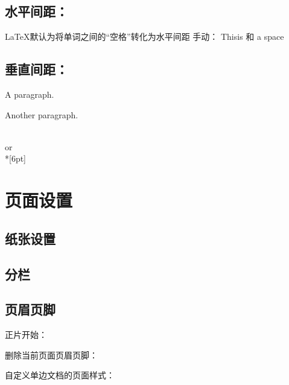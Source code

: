 \documentclass[10pt,a4paper,twocolumn]{book}
\begin{document}
\subsection{水平间距：}
\LaTeX 默认为将单词之间的“空格”转化为水平间距
手动：
This\hspace{1.5cm}is \quad 和 \qquad a space

\subsection{垂直间距：}

{
A paragraph.

\vspace{2ex} 
Another paragraph.
}
\\[6pt] or \\*[6pt]

\section{页面设置}
\subsection{纸张设置}
\subsection{分栏}
\subsection{页眉页脚}




正片开始：

删除当前页面页眉页脚： %

自定义单边文档的页面样式：
\end{document}
